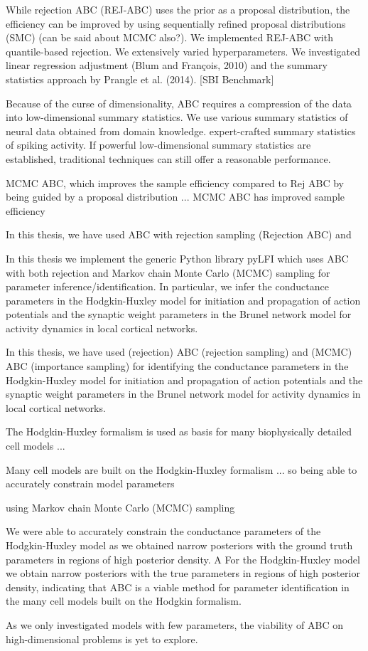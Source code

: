 While rejection ABC (REJ-ABC) uses the prior as a proposal distribution, the efficiency can be improved by using sequentially refined proposal distributions (SMC) (can be said about MCMC also?). We implemented REJ-ABC with quantile-based rejection. 
We extensively varied hyperparameters. We investigated linear regression adjustment (Blum and François, 2010) and the summary statistics approach
by Prangle et al. (2014). [SBI Benchmark]



Because of the curse of dimensionality, ABC requires a compression of the data into low-dimensional summary statistics. We use various summary statistics of neural data obtained from domain knowledge.  expert-crafted summary statistics of spiking activity. If powerful low-dimensional summary statistics are established, traditional techniques can still offer a reasonable performance.

MCMC ABC, which improves the sample efficiency compared to Rej ABC by being guided by a proposal distribution ... MCMC ABC has improved sample efficiency 



In this thesis, we have used ABC with rejection sampling (Rejection ABC) and

In this thesis we implement the generic Python library pyLFI which uses ABC with both rejection and Markov chain Monte Carlo (MCMC) sampling for parameter inference/identification. In particular, we infer the conductance parameters in the Hodgkin-Huxley model for initiation and propagation of action potentials and the synaptic weight parameters in the Brunel network model for activity dynamics in local cortical networks. 

In this thesis, we have used (rejection) ABC (rejection sampling) and (MCMC) ABC (importance sampling) for identifying the conductance parameters in the Hodgkin-Huxley model for initiation and propagation of action potentials and the synaptic weight parameters in the Brunel network model for activity dynamics in local cortical networks. 

The Hodgkin-Huxley formalism is used as basis for many biophysically detailed cell models ...

Many cell models are built on the Hodgkin-Huxley formalism ... so being able to accurately constrain model parameters

using Markov chain Monte Carlo (MCMC) sampling

We were able to accurately constrain the conductance parameters of the Hodgkin-Huxley model as we obtained narrow posteriors with the ground truth parameters in regions of high posterior density. A 
For the Hodgkin-Huxley model we obtain narrow posteriors with the true parameters in regions of high posterior density, indicating that ABC is a viable method for parameter identification in the many cell models built on the Hodgkin formalism. 

As we only investigated models with few parameters, the viability of ABC on high-dimensional problems is yet to explore. 